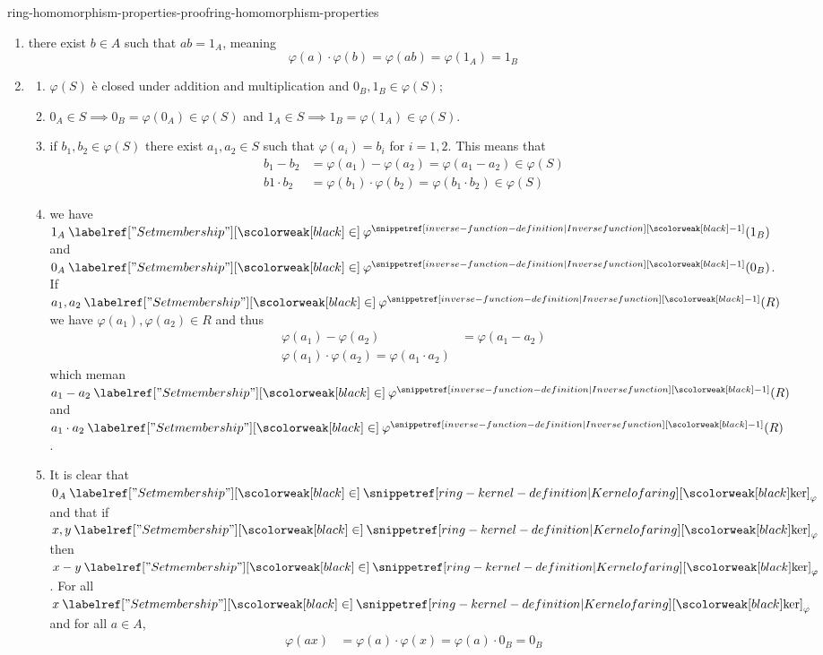 \documentclass[preview]{standalone}
\begin{document}
\begin{snippetproof}{ring-homomorphism-properties-proof}{ring-homomorphism-properties}{}
    \begin{enumerate}
        \item there exist \(b\in A\) such that \(ab = 1_A\), meaning
        \[
            \varphi(a) \cdot \varphi(b) = \varphi(ab) = \varphi(1_A) = 1_B
        \]
        \item \begin{enumerate}
            \item \(\varphi(S)\) è closed under addition and multiplication and \(0_B, 1_B \in \varphi(S)\);
            \item \(0_A \in S \implies 0_B = \varphi(0_A) \in \varphi(S)\)
            and \(1_A \in S \implies 1_B = \varphi(1_A) \in \varphi(S)\).
            \item if \(b_1, b_2 \in \varphi(S)\) there exist \(a_1, a_2 \in S\)
            such that \(\varphi(a_i) = b_i\) for \(i=1,2\).
            This means that
            \begin{align*}
                b_1 - b_2 &= \varphi(a_1) - \varphi(a_2) = \varphi(a_1 - a_2) \in \varphi(S) \\
                b1 \cdot b_2 &= \varphi(b_1) \cdot \varphi(b_2) = \varphi(b_1 \cdot b_2) \in \varphi(S)
            \end{align*}
            \item we have \(1_A \in \varphi^\inversefunction(1_B)\)
            and \(0_A \in \varphi^\inversefunction(0_B)\).
            If \(a_1, a_2 \in \varphi^\inversefunction(R)\) we have
            \(\varphi(a_1),\varphi(a_2) \in R\) and thus
            \begin{align*}
                \varphi(a_1) - \varphi(a_2) &= \varphi(a_1 - a_2) \\
                \varphi(a_1) \cdot \varphi(a_2) = \varphi(a_1 \cdot a_2)
            \end{align*}
            which meman \(a_1 - a_2\in \varphi^\inversefunction(R)\)
            and \(a_1 \cdot a_2\in \varphi^\inversefunction(R)\).
            \item It is clear that \(0_A \in \ringker_\varphi\)
            and that if \(x,y \in \ringker_\varphi\) then \(x-y \in \ringker_\varphi\).
            For all \(x \in \ringker_\varphi\) and for all \(a \in A\),
            \begin{align*}
                \varphi(ax) &= \varphi(a) \cdot \varphi(x)
                = \varphi(a) \cdot 0_B = 0_B \\

\end{align*}
\end{enumerate}
\end{enumerate}
\end{snippetproof}
\end{document}

